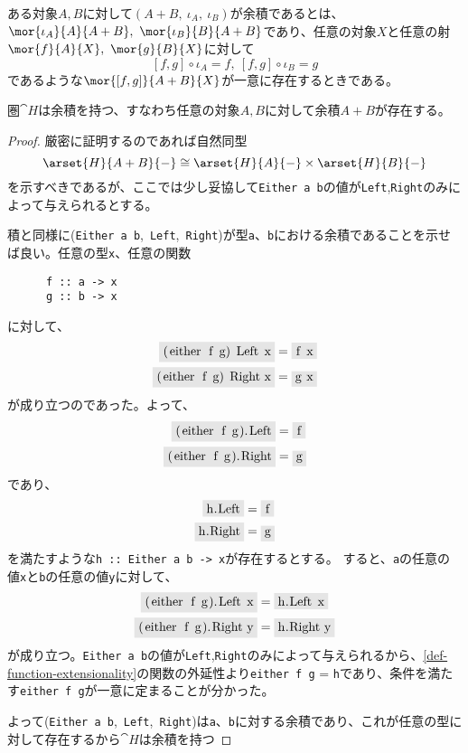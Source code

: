 \documentclass[uplatex,dvipdfmx]{jsarticle}
\newcommand{\pr}[1]{\colorbox[rgb]{0.9,0.9,0.9}{\lstinline{#1}}}
\begin{document}
  \begin{define}[余積の定義]
    ある対象$A,B$に対して$(A+B,\ \iota_A,\ \iota_B)$が余積であるとは、
    $\mor{\iota_A}{A}{A+B},\ \mor{\iota_B}{B}{A+B}$であり、任意の対象$X$と任意の射$\mor{f}{A}{X},\ \mor{g}{B}{X}$に対して
    \[[f,g]\circ\iota_A = f,\ [f,g]\circ\iota_B = g\]であるような$\mor{[f,g]}{A+B}{X}$が一意に存在するときである。
  \end{define}
  \begin{prop}\label{prop-h-has-coproduct}
    圏$\cat{H}$は余積を持つ、すなわち任意の対象$A,B$に対して余積$A+B$が存在する。
  \end{prop}
  \begin{proof}
    厳密に証明するのであれば自然同型\[\arset{H}{A+B}{-}\cong\arset{H}{A}{-}\times \arset{H}{B}{-}\]を示すべきであるが、ここでは少し妥協して\pr{Either a b}の値が\pr{Left},\pr{Right}のみによって与えられるとする。


    積と同様に(\pr{Either a b},\ \pr{Left},\ \pr{Right})が型\pr{a}、\pr{b}における余積であることを示せば良い。任意の型\pr{x}、任意の関数
    \begin{lstlisting}
      f :: a -> x
      g :: b -> x
    \end{lstlisting}
    に対して、
    \begin{align*}
      \pr{(either f g) Left x} &= \pr{f x}\\
      \pr{(either f g) Right x} &= \pr{g x}
    \end{align*}
    が成り立つのであった。よって、
    \begin{align*}
      \pr{(either f g).Left} &= \pr{f}\\
      \pr{(either f g).Right} &= \pr{g}
    \end{align*}
    であり、
    \begin{align*}
      \pr{h.Left} &= \pr{f}\\
      \pr{h.Right} &= \pr{g}
    \end{align*}
    を満たすような\pr{h :: Either a b -> x}が存在するとする。
    すると、\pr{a}の任意の値\pr{x}と\pr{b}の任意の値\pr{y}に対して、
    \begin{align*}
      \pr{(either f g).Left x} &= \pr{h.Left x}\\
      \pr{(either f g).Right y} &= \pr{h.Right y}
    \end{align*}
    が成り立つ。\pr{Either a b}の値が\pr{Left},\pr{Right}のみによって与えられるから、\ref{def-function-extensionality}の関数の外延性より\pr{either f g} = \pr{h}であり、条件を満たす\pr{either f g}が一意に定まることが分かった。

    よって(\pr{Either a b},\ \pr{Left},\ \pr{Right})は\pr{a}、\pr{b}に対する余積であり、これが任意の型に対して存在するから$\cat{H}$は余積を持つ
  \end{proof}
\end{document}
